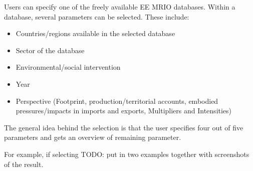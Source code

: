 Users can specify one of the freely available EE MRIO databases. 
Within a database, several parameters can be selected. These include:

\begin{itemize}
    \item Countries/regions available in the selected database
    \item Sector of the database
    \item Environmental/social intervention
    \item Year
    \item Perspective (Footprint, production/territorial accounts, embodied
      pressures/impacts in imports and exports, Multipliers and Intensities)
\end{itemize}


The general idea behind the selection is that the user specifies four out
of five parameters and gets an overview of remaining parameter.

For example, if selecting TODO: put in two examples together with
screenshots of the result.